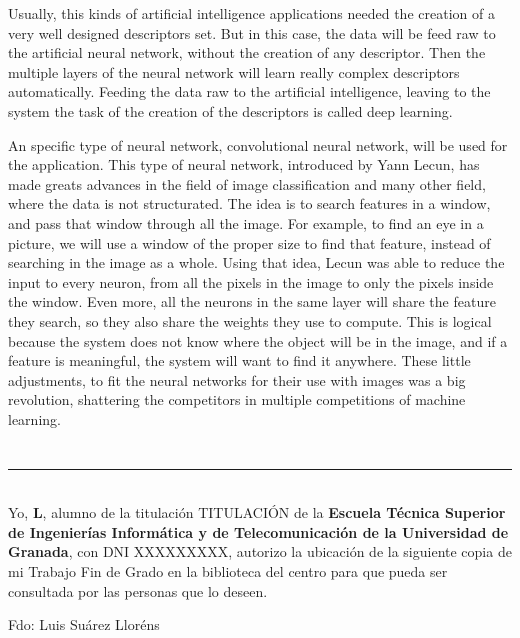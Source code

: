 Usually, this kinds of artificial intelligence applications needed the creation of a very well designed descriptors set. But in this case, the data will be feed raw to the artificial neural network, without the creation of any descriptor. Then the multiple layers of the neural network will learn really complex descriptors automatically.  Feeding the data raw to the artificial intelligence, leaving to the system the task of the creation of the descriptors is called deep learning.

An specific type of neural network, convolutional neural network, will be used for the application. This type of neural network, introduced by Yann Lecun, has made greats advances in the field of image classification and many other field, where the data is not structurated. The idea is to search features in a window, and pass that window through all the image. For example, to find an eye in a picture, we will use a window of the proper size to find that feature, instead of searching in the image as a whole. Using that idea, Lecun was able to reduce the input to every neuron, from all the pixels in the image to only the pixels inside the window. Even more, all the neurons in the same layer will share the feature they search, so they also share the weights they use to compute. This is logical because the system does not know where the object will be in the image, and if a feature is meaningful, the system will want to find it anywhere. These little adjustments, to fit the neural networks for their use with images was a big revolution, shattering the competitors in multiple competitions of machine learning.
\chapter*{}
\thispagestyle{empty}

\noindent\rule[-1ex]{\textwidth}{2pt}\\[4.5ex]

Yo, \textbf{L}, alumno de la titulación TITULACIÓN de la \textbf{Escuela Técnica Superior
de Ingenierías Informática y de Telecomunicación de la Universidad de Granada}, con DNI XXXXXXXXX, autorizo la
ubicación de la siguiente copia de mi Trabajo Fin de Grado en la biblioteca del centro para que pueda ser
consultada por las personas que lo deseen.

\vspace{6cm}

\noindent Fdo: Luis Suárez Lloréns

\vspace{2cm}

